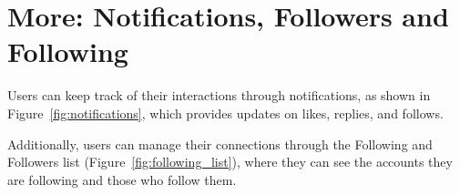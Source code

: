 \section{More: Notifications, Followers and Following}
Users can keep track of their interactions through notifications, as shown in Figure~\ref{fig:notifications}, which provides updates on likes, replies, and follows.

Additionally, users can manage their connections through the Following and Followers list (Figure~\ref{fig:following_list}), where they can see the accounts they are following and those who follow them.

\begin{figure}[htbp]
  \centering
  \begin{minipage}[b]{0.45\linewidth}
    \centering

\end{minipage}
\end{figure}
